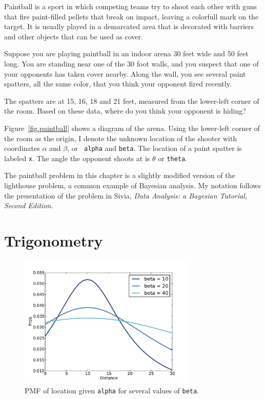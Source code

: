 \documentclass[12pt]{book}
\begin{document}
Paintball is a sport in which competing teams try to shoot each other
with guns that fire paint-filled pellets that break on impact, leaving
a colorfull mark on the target.  It is usually played in a demarcated
area that is decorated with barriers and other objects that can be
used as cover.

Suppose you are playing paintball in an indoor arena 30 feet
wide and 50 feet long.  You are standing near one of the 30 foot
walls, and you suspect that one of your opponents has taken cover
nearby.  Along the wall, you see several paint spatters, all the same
color, that you think your opponent fired recently.

The spatters are at 15, 16, 18 and 21 feet, measured from the
lower-left corner of the room.  Based on these data, where do you
think your opponent is hiding?

Figure~\ref{fig.paintball} shows a diagram of the arena.  Using the
lower-left corner of the room as the origin, I denote the unknown
location of the shooter with coordinates $\alpha$ and $\beta$, or {\tt
  alpha} and {\tt beta}.  The location of a paint spatter is labeled
{\tt x}.  The angle the opponent shoots at is $\theta$ or {\tt theta}.

The paintball problem in this chapter is a slightly modified version
of the lighthouse problem, a common example of Bayesian analysis.  My
notation follows the presentation of the problem in Sivia, {\it Data
  Analysis: a Bayesian Tutorial, Second Edition}.


\section{Trigonometry}

\begin{figure}
\centerline{\includegraphics[height=2.5in]{figs/paintball1.pdf}}
\caption{PMF of location given {\tt alpha} for several values of {\tt beta}.}
\label{fig.paintball1}
\end{figure}
\end{document}
